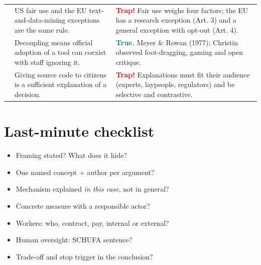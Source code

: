 \documentclass[11pt,a4paper]{article}
\begin{document}
\begin{longtable}{>{\RaggedRight\arraybackslash}p{0.5cm}>{\RaggedRight\arraybackslash}p{7.6cm}>{\RaggedRight\arraybackslash}p{7.4cm}}
18 & US fair use and the EU text-and-data-mining exceptions are the same rule. & \textcolor{red}{\textbf{Trap!}} Fair use weighs four factors; the EU has a research exception (Art. 3) and a general exception with opt-out (Art. 4).\\[3pt]
19 & Decoupling means official adoption of a tool can coexist with staff ignoring it. & \textcolor{teal}{\textbf{True.}} Meyer \& Rowan (1977); Christin observed foot-dragging, gaming and open critique.\\[3pt]
20 & Giving source code to citizens is a sufficient explanation of a decision. & \textcolor{red}{\textbf{Trap!}} Explanations must fit their audience (experts, laypeople, regulators) and be selective and contrastive.\\[3pt]
\end{longtable}
\section*{Last-minute checklist}\begin{itemize}\item Framing stated? What does it hide?\item One named concept + author per argument?\item Mechanism explained \emph{in this case}, not in general?\item Concrete measure with a responsible actor?\item Workers: who, contract, pay, internal or external?\item Human oversight: SCHUFA sentence?\item Trade-off and stop trigger in the conclusion?\end{itemize}
\end{document}
